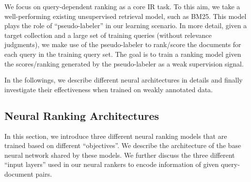 We focus on query-dependent ranking as a core IR task. To this aim, we take a well-performing existing unsupervised retrieval model, such as BM25. This model plays the role of ``pseudo-labeler'' in our learning scenario. In more detail, given a target collection and a large set of training queries (without relevance judgments), we make use of the pseudo-labeler to rank/score the documents for each query in the training query set. The goal is to train a ranking model given the scores/ranking generated by the pseudo-labeler as a weak supervision signal.

In the followings, we describe different neural architectures in details and finally investigate their effectiveness when trained on weakly annotated data.  

\subsection{Neural Ranking Architectures}
\label{sec:neural_ranking_arch}
In this section, we introduce three different neural ranking models that are trained based on different ``objectives''. We describe the architecture of the base neural network shared by these models. We further discuss the three different ``input layers'' used in our neural rankers to encode information of given query-document pairs.
\medskip

